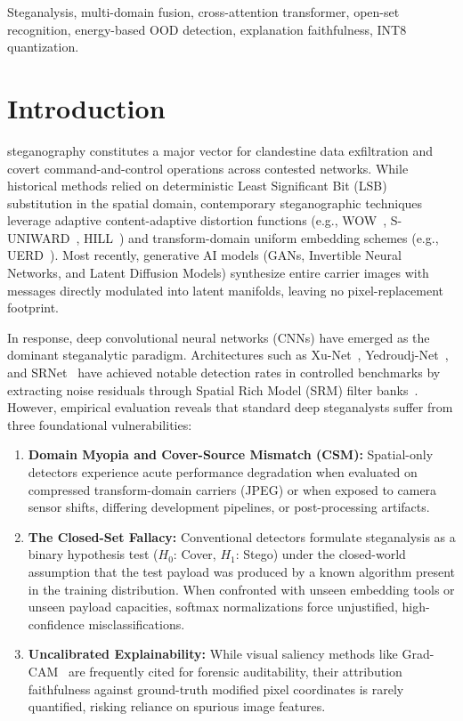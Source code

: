 \documentclass[journal]{IEEEtran}
\begin{document}
\begin{IEEEkeywords}
Steganalysis, multi-domain fusion, cross-attention transformer, open-set recognition, energy-based OOD detection, explanation faithfulness, INT8 quantization.
\end{IEEEkeywords}

\section{Introduction}
 steganography constitutes a major vector for clandestine data exfiltration and covert command-and-control operations across contested networks. While historical methods relied on deterministic Least Significant Bit (LSB) substitution in the spatial domain, contemporary steganographic techniques leverage adaptive content-adaptive distortion functions (e.g., WOW~\cite{holub2012designing}, S-UNIWARD~\cite{holub2014designing}, HILL~\cite{li2014new}) and transform-domain uniform embedding schemes (e.g., UERD~\cite{guo2014using}). Most recently, generative AI models (GANs, Invertible Neural Networks, and Latent Diffusion Models) synthesize entire carrier images with messages directly modulated into latent manifolds, leaving no pixel-replacement footprint.

In response, deep convolutional neural networks (CNNs) have emerged as the dominant steganalytic paradigm. Architectures such as Xu-Net~\cite{xu2016structural}, Yedroudj-Net~\cite{yedroudj2018net}, and SRNet~\cite{boroumand2018deep} have achieved notable detection rates in controlled benchmarks by extracting noise residuals through Spatial Rich Model (SRM) filter banks~\cite{fridrich2012rich}. However, empirical evaluation reveals that standard deep steganalysts suffer from three foundational vulnerabilities:
\begin{enumerate}
    \item \textbf{Domain Myopia and Cover-Source Mismatch (CSM):} Spatial-only detectors experience acute performance degradation when evaluated on compressed transform-domain carriers (JPEG) or when exposed to camera sensor shifts, differing development pipelines, or post-processing artifacts.
    \item \textbf{The Closed-Set Fallacy:} Conventional detectors formulate steganalysis as a binary hypothesis test ($H_0$: Cover, $H_1$: Stego) under the closed-world assumption that the test payload was produced by a known algorithm present in the training distribution. When confronted with unseen embedding tools or unseen payload capacities, softmax normalizations force unjustified, high-confidence misclassifications.
    \item \textbf{Uncalibrated Explainability:} While visual saliency methods like Grad-CAM~\cite{selvaraju2017gradcam} are frequently cited for forensic auditability, their attribution faithfulness against ground-truth modified pixel coordinates is rarely quantified, risking reliance on spurious image features.
\end{enumerate}
\end{document}
